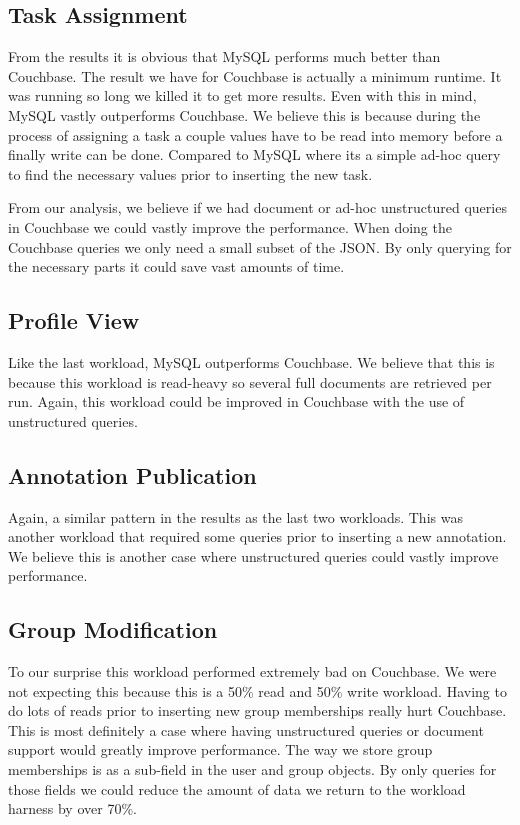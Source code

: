 \documentclass[10pt, conference, compsocconf]{IEEEtran}
\begin{document}
\subsection{Task Assignment}
From the results it is obvious that MySQL performs much better than Couchbase.
The result we have for Couchbase is actually a minimum runtime. It was running
so long we killed it to get more results. Even with this in mind, MySQL vastly
outperforms Couchbase. We believe this is because during the process of
assigning a task a couple values have to be read into memory before a finally
write can be done. Compared to MySQL where its a simple ad-hoc query to find
the necessary values prior to inserting the new task.

From our analysis, we believe if we had document or ad-hoc unstructured queries
in Couchbase we could vastly improve the performance.  When doing the Couchbase
queries we only need a small subset of the JSON. By only querying for the
necessary parts it could save vast amounts of time.

\subsection{Profile View}
Like the last workload, MySQL outperforms Couchbase. We believe that this is
because this workload is read-heavy so several full documents are retrieved per
run.  Again, this workload could be improved in Couchbase with the use of
unstructured queries.

\subsection{Annotation Publication}
Again, a similar pattern in the results as the last two workloads. This was
another workload that required some queries prior to inserting a new
annotation. We believe this is another case where unstructured queries could
vastly improve performance.

\subsection{Group Modification}
To our surprise this workload performed extremely bad on Couchbase. We were not
expecting this because this is a 50\% read and 50\% write workload. Having to
do lots of reads prior to inserting new group memberships really hurt
Couchbase. This is most definitely a case where having unstructured queries or
document support would greatly improve performance. The way we store group
memberships is as a sub-field in the user and group objects. By only queries
for those fields we could reduce the amount of data we return to the workload
harness by over 70\%.
\end{document}
